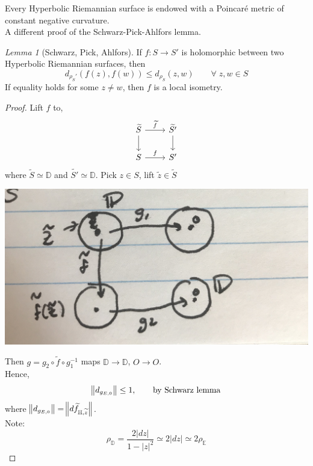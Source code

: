 \documentclass[a4paper, 11pt]{book}
\theoremstyle{definition}
\theoremstyle{remark}
\newtheorem{lemma}[theorem]{Lemma}
\begin{document}
    Every Hyperbolic Riemannian surface is endowed with a Poincaré metric of constant negative curvature.\\

    A different proof of the Schwarz-Pick-Ahlfors lemma.

    \begin{lemma}[Schwarz, Pick, Ahlfors]
        If $f:S\to S'$ is holomorphic between two Hyperbolic Riemannian surfaces, then
        \[ d_{\rho_S'}(f(z),f(w)) \leq d_{\rho_S}(z,w)\qquad \forall\;z,w\in S\]
        If equality holds for some $z\neq w$, then $f$ is a local isometry.
    \end{lemma}
    \begin{proof}
        Lift $f$ to,
        \begin{equation*}
        \begin{tikzcd}
            \widetilde{S} \arrow{r}{\widetilde{f}} \arrow{d} & \widetilde{S'} \arrow{d} \\
             S \arrow{r}{f} & S'
        \end{tikzcd}
        \end{equation*}
        where $\widetilde{S}\simeq \mathbb{D}$ and $\widetilde{S'}\simeq \mathbb{D}$. Pick $z\in S$, 
        lift $\widetilde{z}\in \widetilde{S}$

        \begin{center}
            \includegraphics[scale=0.05]{IMG_1016}
        \end{center}
        Then $g = g_2\circ \widetilde{f} \circ g_1^{-1}$ maps $\mathbb{D}\to\mathbb{D}$, $O\to O$.\\

        Hence,
        \[ \norm{d_{g_{E,0}}}\leq 1, \qquad \text{by Schwarz lemma} \]
        where $\norm{d_{g_{E,0}}} = \norm{d\widetilde{f}_{\mathbb{H},\widetilde{z}}}$.\\

        Note: 
        \[ \rho_{\mathbb{D}} = \frac{2|dz|}{1-|z|^2} \simeq 2|dz| \simeq 2\rho_{\mathbb{E}} \]
    \end{proof}
\end{document}
